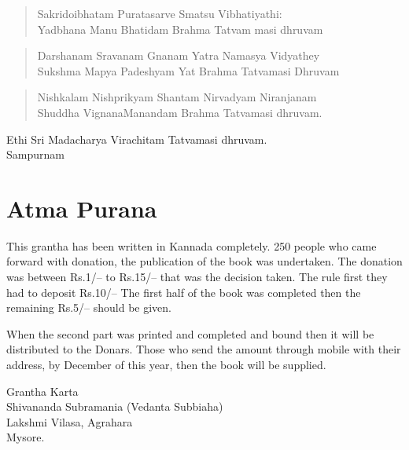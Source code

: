 \begin{verse}
 Sakridoibhatam Puratasarve Smatsu Vibhatiyathi:\\
 Yadbhana Manu Bhatidam Brahma Tatvam masi dhruvam
\end{verse}

\begin{verse}
 Darshanam Sravanam Gnanam Yatra Namasya Vidyathey\\
 Sukshma Mapya Padeshyam Yat Brahma Tatvamasi Dhruvam
\end{verse}

\begin{verse}
 Nishkalam Nishprikyam Shantam Nirvadyam Niranjanam\\
 Shuddha VignanaManandam Brahma Tatvamasi dhruvam.
\end{verse}

\begin{center}
Ethi Sri Madacharya Virachitam Tatvamasi dhruvam. \\ Sampurnam
\end{center}

\delimiter

\chapter*{Atma Purana}

This grantha has been written in Kannada completely. 250 people who came forward with donation, the publication of the book was undertaken. The donation was between Rs.1/– to Rs.15/– that was the decision taken. The rule first they had to deposit Rs.10/– The first half of the book was completed then the remaining Rs.5/– should be given.

When the second part was printed and completed and bound then it will be distributed to the Donars. Those who send the amount through mobile with their address, by December of this year, then the book will be supplied.

\begin{center}
Grantha Karta\\ Shivananda Subramania (Vedanta Subbiaha)\\ Lakshmi Vilasa, Agrahara\\ Mysore.
\end{center}

\delimiter

